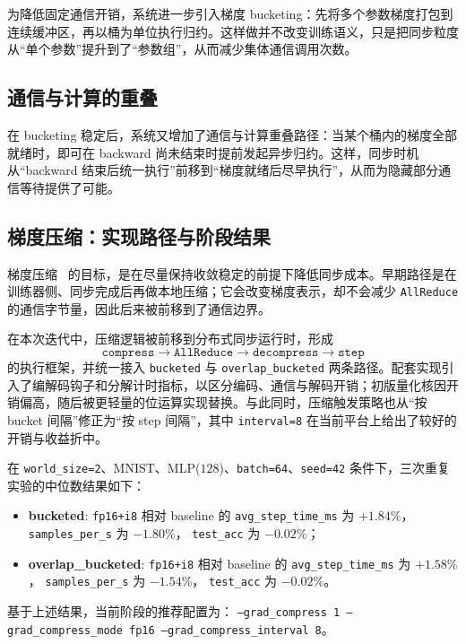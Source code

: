 \documentclass[a4paper,11pt,oneside]{article}
\begin{document}
为降低固定通信开销，系统进一步引入梯度 bucketing：先将多个参数梯度打包到连续缓冲区，再以桶为单位执行归约。这样做并不改变训练语义，只是把同步粒度从“单个参数”提升到了“参数组”，从而减少集体通信调用次数。

\subsection{通信与计算的重叠}

在 bucketing 稳定后，系统又增加了通信与计算重叠路径：当某个桶内的梯度全部就绪时，即可在 backward 尚未结束时提前发起异步归约。这样，同步时机从“backward 结束后统一执行”前移到“梯度就绪后尽早执行”，从而为隐藏部分通信等待提供了可能。

\subsection{梯度压缩：实现路径与阶段结果}

梯度压缩~\cite{alistarh2017qsgd} 的目标，是在尽量保持收敛稳定的前提下降低同步成本。早期路径是在训练器侧、同步完成后再做本地压缩；它会改变梯度表示，却不会减少 \texttt{AllReduce} 的通信字节量，因此后来被前移到了通信边界。

在本次迭代中，压缩逻辑被前移到分布式同步运行时，形成
\[
\texttt{compress} \rightarrow \texttt{AllReduce} \rightarrow \texttt{decompress} \rightarrow \texttt{step}
\]
的执行框架，并统一接入 \texttt{bucketed} 与 \texttt{overlap\_bucketed} 两条路径。配套实现引入了编解码钩子和分解计时指标，以区分编码、通信与解码开销；初版量化核因开销偏高，随后被更轻量的位运算实现替换。与此同时，压缩触发策略也从“按 bucket 间隔”修正为“按 step 间隔”，其中 \texttt{interval=8} 在当前平台上给出了较好的开销与收益折中。

在 \texttt{world\_size=2}、MNIST、MLP(\(128\))、\texttt{batch=64}、\texttt{seed=42} 条件下，三次重复实验的中位数结果如下：

\begin{itemize}
  \item \textbf{bucketed}: \texttt{fp16+i8} 相对 baseline 的
  \texttt{avg\_step\_time\_ms} 为 \(+1.84\%\)，
  \texttt{samples\_per\_s} 为 \(-1.80\%\)，
  \texttt{test\_acc} 为 \(-0.02\%\)；
  \item \textbf{overlap\_bucketed}: \texttt{fp16+i8} 相对 baseline 的
  \texttt{avg\_step\_time\_ms} 为 \(+1.58\%\)，
  \texttt{samples\_per\_s} 为 \(-1.54\%\)，
  \texttt{test\_acc} 为 \(-0.02\%\)。
\end{itemize}

基于上述结果，当前阶段的推荐配置为：
\texttt{--grad\_compress 1 --grad\_compress\_mode fp16 --grad\_compress\_interval 8}。
\end{document}
